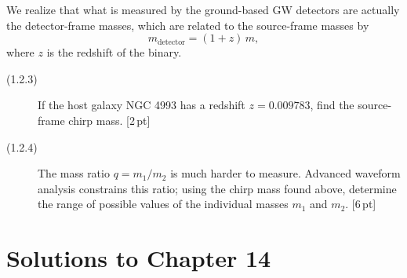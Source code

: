 We realize that what is measured by the ground-based GW detectors are actually
the detector-frame masses, which are related to the source-frame masses by
\[ m_{\mathrm{detector}} = (1+z)\,m, \]
where $z$ is the redshift of the binary.

\begin{description}
\item[(1.2.3)] If the host galaxy NGC 4993 has a redshift $z = 0.009783$, find
  the source-frame chirp mass. \hfill[2\,pt]
\item[(1.2.4)] The mass ratio $q = m_1/m_2$ is much harder to measure. Advanced
  waveform analysis constrains this ratio; using the chirp mass found above,
  determine the range of possible values of the individual masses $m_1$ and
  $m_2$. \hfill[6\,pt]
\end{description}

\clearpage
\section*{Solutions to Chapter 14}

